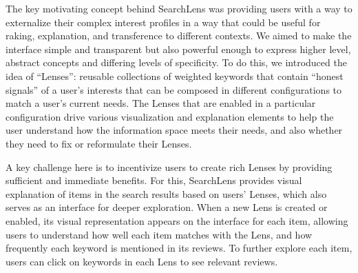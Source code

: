 \documentclass{sigchi}
\begin{document}

The key motivating concept behind SearchLens was providing users with a way to externalize their complex interest profiles in a way that could be useful for raking, explanation, and transference to different contexts. We aimed to make the interface simple and transparent but also powerful enough to express higher level, abstract concepts and differing levels of specificity.
To do this, we introduced the idea of ``Lenses'': reusable collections of weighted keywords that contain ``honest signals'' of a user's interests that can be composed in different configurations to match a user's current needs. The Lenses that are enabled in a particular configuration drive various visualization and explanation elements to help the user understand how the information space meets their needs, and also whether they need to fix or reformulate their Lenses. 

A key challenge here is to incentivize users to create rich Lenses by providing sufficient and immediate benefits. For this, SearchLens provides visual explanation of items in the search results based on users' Lenses, which also serves as an interface for deeper exploration. When a new Lens is created or enabled, its visual representation appears on the interface for each item, allowing users to understand how well each item matches with the Lens, and how frequently each keyword is mentioned in its reviews. To further explore each item, users can click on keywords in each Lens to see relevant reviews.
\end{document}
